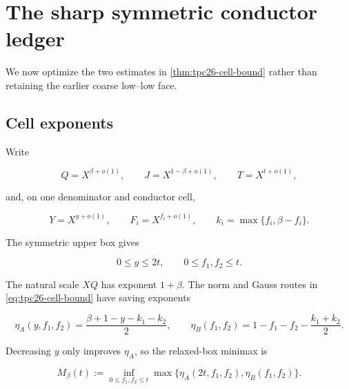 \section{The sharp symmetric conductor ledger}
\label{sec:tpc26-sharp-ledger}

We now optimize the two estimates in
\cref{thm:tpc26-cell-bound} rather than retaining the earlier coarse
low--low face.

\subsection{Cell exponents}

Write

\begin{equation}
 Q=X^{\beta+o(1)},
 \qquad J=X^{1-\beta+o(1)},
 \qquad T=X^{t+o(1)},
 \label{eq:tpc26-main-exponents}
\end{equation}

and, on one denominator and conductor cell,

\begin{equation}
 Y=X^{y+o(1)},
 \qquad F_i=X^{f_i+o(1)},
 \qquad
 k_i=\max\{f_i,\beta-f_i\}.
 \label{eq:tpc26-cell-exponents}
\end{equation}

The symmetric upper box gives

\begin{equation}
 0\le y\le2t,
 \qquad 0\le f_1,f_2\le t.
 \label{eq:tpc26-cell-box}
\end{equation}

The natural scale \(XQ\) has exponent \(1+\beta\).  The norm and
Gauss routes in \eqref{eq:tpc26-cell-bound} have saving exponents

\begin{equation}
 \eta_A(y,f_1,f_2)
 =\frac{\beta+1-y-k_1-k_2}{2},
 \qquad
 \eta_B(f_1,f_2)
 =1-f_1-f_2-\frac{k_1+k_2}{2}.
 \label{eq:tpc26-etaAB}
\end{equation}

Decreasing \(y\) only improves \(\eta_A\), so the relaxed-box minimax
is

\begin{equation}
 M_\beta(t)
 :=\inf_{0\le f_1,f_2\le t}
 \max\{
 \eta_A(2t,f_1,f_2),
 \eta_B(f_1,f_2)
 \}.
 \label{eq:tpc26-Mbeta}
\end{equation}


